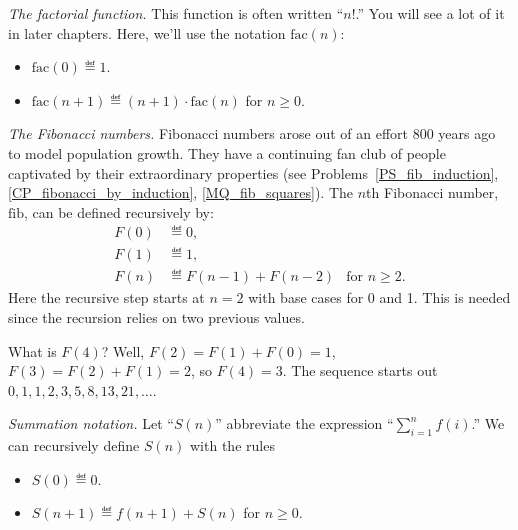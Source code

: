 \begin{example}\label{factorial-def}

\emph{The factorial%
 function.}  This function is often written
``$n!$.''  You will see a lot of it in later chapters.  Here, we'll use
the notation $\text{fac}(n)$:
\begin{itemize}
\item $\text{fac}(0) \eqdef 1$.
\item $\text{fac}(n+1) \eqdef (n+1)\cdot \text{fac}(n)$ for $n \ge 0$.
\end{itemize}

\end{example}
\begin{example}\label{fib-def}
\emph{The Fibonacci numbers.}  Fibonacci numbers%
arose out of an effort 800 years ago to model population growth.  They have a
continuing fan club of people captivated by their extraordinary
properties (see Problems~\ref{PS_fib_induction},
\ref{CP_fibonacci_by_induction}, \ref{MQ_fib_squares}).  The $n$th
Fibonacci number, $\text{fib}$, can be defined recursively by:
\begin{align*}
F(0) &\eqdef 0,\\
F(1) &\eqdef 1,\\ 
F(n) &\eqdef F(n-1) + F(n-2) &\mbox{for $n \geq 2$.} 
\end{align*}
Here the recursive step starts at $n=2$ with base cases for 0 and 1.  This
is needed since the recursion relies on two previous values.

What is $F(4)$?  Well, $F(2) = F(1)+F(0) = 1$, $F(3) =
F(2)+F(1) = 2$, so $F(4) = 3$.  The sequence
starts out $0, 1, 1, 2, 3, 5, 8, 13, 21,\dots$.

\end{example}

\begin{example}

\emph{Summation notation.}\label{sum-notation-def} Let 
``$S(n)$'' abbreviate the expression ``$\sum_{i=1}^n f(i)$.''  We can recursively define
$S(n)$ with the rules
  \begin{itemize}
  \item $S(0) \eqdef 0$.
  \item $S(n+1) \eqdef  f(n+1) + S(n)$ for $n\geq 0$.
  \end{itemize}
\end{example}

